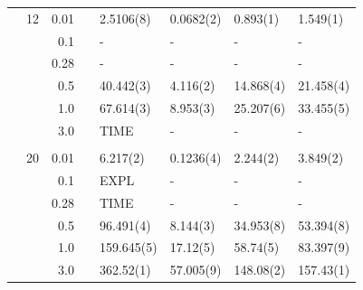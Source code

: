 \begin{table}
\begin{tabularx}{\textwidth}{R{1.5cm}rrcR{2.3cm}R{2.3cm}R{2.3cm}R{2.3cm}}
		&12 & 0.01 && 2.5106(8) & 0.0682(2) & 0.893(1) & 1.549(1) \\
		&& 0.1 && - & - & - & - \\
		&& 0.28 && - & - & - & - \\
		&& 0.5 && 40.442(3) & 4.116(2) & 14.868(4) & 21.458(4) \\
		&& 1.0 && 67.614(3) & 8.953(3) & 25.207(6) & 33.455(5) \\
		&& 3.0 && TIME & - & - & - \\ \hdashline \\
		
		&20 & 0.01 && 6.217(2) & 0.1236(4) & 2.244(2) & 3.849(2) \\
		&& 0.1 && EXPL & - & - & - \\
		&& 0.28 && TIME & - & - & - \\
		&& 0.5 && 96.491(4) & 8.144(3) & 34.953(8) & 53.394(8) \\
		&& 1.0 && 159.645(5) & 17.12(5) & 58.74(5) & 83.397(9) \\
		&& 3.0 && 362.52(1) & 57.005(9) & 148.08(2) & 157.43(1) \\ \hline \hline
	\end{tabularx}
\end{table} 

